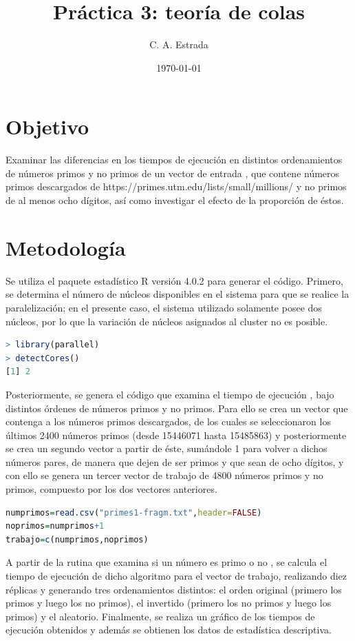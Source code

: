 \documentclass{article}
\title{\bf Práctica 3: teoría de colas}
\date{\today}
\author{C. A. Estrada}
\begin{document}
\maketitle

\section{Objetivo}
Examinar las diferencias en los tiempos de ejecución en distintos ordenamientos de números primos y no primos de un vector de entrada \cite{dra}, que contene números primos descargados de https://primes.utm.edu/lists/small/millions/ y no primos de al menos ocho dígitos, así como investigar el efecto de la proporción de éstos.

\section{Metodología}
Se utiliza el paquete estadístico R versión 4.0.2 \cite{R} para generar el código. Primero, se determina el número de núcleos disponibles en el sistema para que se realice la paralelización; en el presente caso, el sistema utilizado solamente posee dos núcleos, por lo que la variación de núcleos asignados al cluster no es posible.
\begin{lstlisting}[language=R]
> library(parallel)
> detectCores()
[1] 2
\end{lstlisting}
Posteriormente, se genera el código que examina el tiempo de ejecución \cite{dra}\cite{clara}, bajo distintos órdenes de números primos y no primos. Para ello se crea un vector que contenga a los números primos descargados, de los cuales se seleccionaron los últimos 2400 números primos (desde 15446071 hasta 15485863) y posteriormente se crea un segundo vector a partir de éste, sumándole 1 para volver a dichos números pares, de manera que dejen de ser primos y que sean de ocho dígitos, y con ello se genera un tercer vector de trabajo de 4800 números primos y no primos, compuesto por los dos vectores anteriores.
\begin{lstlisting}[language=R]
numprimos=read.csv("primes1-fragm.txt",header=FALSE)
noprimos=numprimos+1 
trabajo=c(numprimos,noprimos)
\end{lstlisting}
A partir de la rutina que examina si un número es primo o no \cite{dra}, se calcula el tiempo de ejecución de dicho algoritmo para el vector de trabajo, realizando diez réplicas y generando tres ordenamientos distintos: el orden original (primero los primos y luego los no primos), el invertido (primero los no primos y luego los primos) y el aleatorio.  Finalmente, se realiza un gráfico de los tiempos de ejecución obtenidos y además se obtienen los datos de estadística descriptiva.
\end{document}
